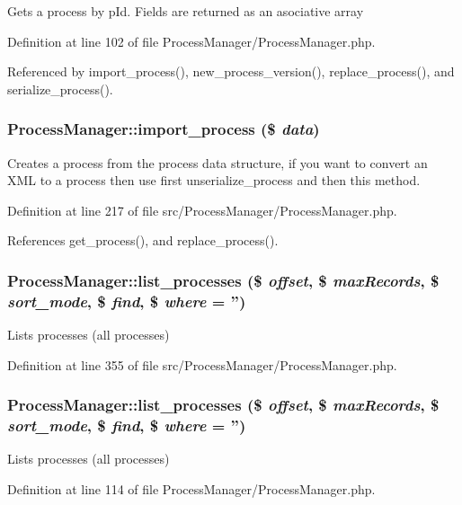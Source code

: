 Gets a process by p\-Id. Fields are returned as an asociative array 

Definition at line 102 of file Process\-Manager/Process\-Manager.php.

Referenced by import\_\-process(), new\_\-process\_\-version(), replace\_\-process(), and serialize\_\-process().
\subsubsection{\setlength{\rightskip}{0pt plus 5cm}Process\-Manager::import\_\-process (\$ {\em data})}\label{classProcessManager_a15}


Creates a process from the process data structure, if you want to convert an XML to a process then use first unserialize\_\-process and then this method. 

Definition at line 217 of file src/Process\-Manager/Process\-Manager.php.

References get\_\-process(), and replace\_\-process().
\subsubsection{\setlength{\rightskip}{0pt plus 5cm}Process\-Manager::list\_\-processes (\$ {\em offset}, \$ {\em max\-Records}, \$ {\em sort\_\-mode}, \$ {\em find}, \$ {\em where} = '')}\label{classProcessManager_a19}


Lists processes (all processes) 

Definition at line 355 of file src/Process\-Manager/Process\-Manager.php.
\subsubsection{\setlength{\rightskip}{0pt plus 5cm}Process\-Manager::list\_\-processes (\$ {\em offset}, \$ {\em max\-Records}, \$ {\em sort\_\-mode}, \$ {\em find}, \$ {\em where} = '')}\label{classProcessManager_a6}


Lists processes (all processes) 

Definition at line 114 of file Process\-Manager/Process\-Manager.php.

